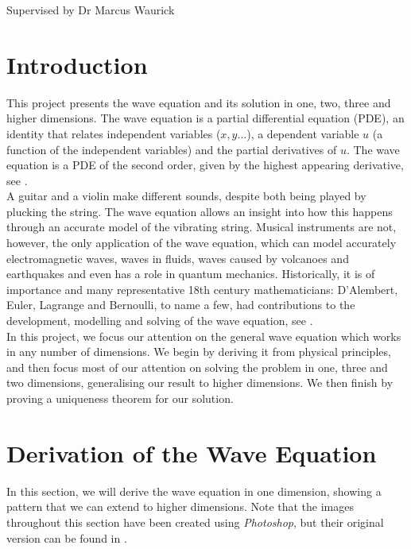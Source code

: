 \documentclass[a4paper, 12pt]{article}
\numberwithin{equation}{section}
\begin{document}
    \vspace*{5cm}
    Supervised by Dr Marcus Waurick
    \newpage
    \normalsize
    \tableofcontents
    \newpage

\section{Introduction}
This project presents the wave equation and its solution in one, two, three and
higher dimensions. The wave equation is a partial differential equation (PDE),
an identity that relates independent variables ($x, y...$), a dependent variable
$u$ (a function of the independent variables) and the partial derivatives of
$u$. The wave equation is a PDE of the second order, given by the highest
appearing derivative, see \cite[Ch. 1, \S]{Fol}. \\

A guitar and a violin make different sounds, despite both being played by
plucking the string. The wave equation allows an insight into how this happens
through an accurate model of the vibrating string. Musical instruments are not,
however, the  only application of the wave equation, which can model accurately
electromagnetic waves, waves in fluids, waves caused by volcanoes and
earthquakes and even has a role in quantum mechanics. Historically, it is of
importance and many representative 18th century mathematicians: D'Alembert,
Euler, Lagrange and Bernoulli, to name a few, had contributions to the
development, modelling and solving of the wave equation, see \cite{Coc}. \\

In this project, we focus our attention on the general wave equation which works
in any number of dimensions. We begin by deriving it from physical principles,
and then focus most of our attention on solving the problem in one, three and
two dimensions, generalising our result to higher dimensions. We then finish by
proving a uniqueness theorem for our solution.

\section{Derivation of the Wave Equation}
In this section, we will derive the wave equation in one dimension, showing a
pattern that we can extend to higher dimensions. Note that the images throughout
this section have been created using \emph{Photoshop}, but their original
version can be found in \cite[Ch. 12.2]{Kr}.
\end{document}
